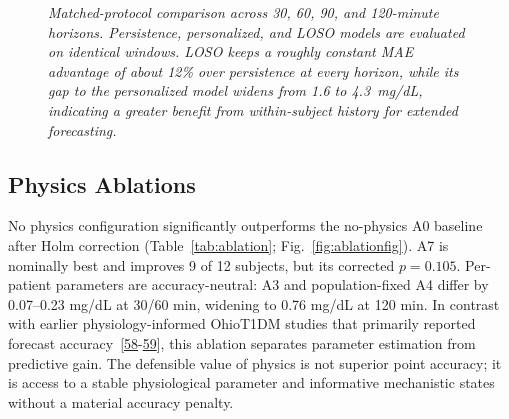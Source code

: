 \documentclass[journal]{IEEEtran}
\begin{document}
\begin{figure}[t]
\centering


\caption{\small\textit{Matched-protocol comparison across 30, 60, 90, and 120-minute horizons. Persistence, personalized, and LOSO models are evaluated on identical windows. LOSO keeps a roughly constant MAE advantage of about 12\% over persistence at every horizon, while its gap to the personalized model widens from 1.6 to 4.3~mg/dL, indicating a greater benefit from within-subject history for extended forecasting.}}
\label{fig:matched_protocol_comparison}
\end{figure}


\subsection{Physics Ablations}

No physics configuration significantly outperforms the no-physics A0 baseline after Holm correction (Table~\ref{tab:ablation}; Fig.~\ref{fig:ablationfig}). A7 is nominally best and improves 9 of 12 subjects, but its corrected $p = 0.105$. Per-patient parameters are accuracy-neutral: A3 and population-fixed A4 differ by 0.07–0.23 mg/dL at 30/60 min, widening to 0.76 mg/dL at 120 min. In contrast with earlier physiology-informed OhioT1DM studies that primarily reported forecast accuracy~[\hyperref[ref58label]{58}-\hyperref[ref59label]{59}], this ablation separates parameter estimation from predictive gain. The defensible value of physics is not superior point accuracy; it is access to a stable physiological parameter and informative mechanistic states without a material accuracy penalty.
\end{document}
